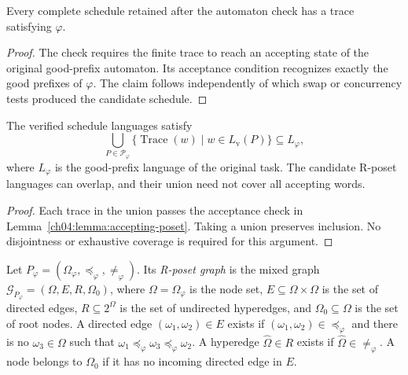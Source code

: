 \begin{revision}
\begin{lemma}
\label{ch04:lemma:accepting-poset}
Every complete schedule retained after the automaton check has a trace
satisfying $\varphi$.
\end{lemma}
\begin{proof}
The check requires the finite trace to reach an accepting state of the
original good-prefix automaton. Its acceptance condition recognizes exactly
the good prefixes of $\varphi$. The claim follows independently of which
swap or concurrency tests produced the candidate schedule.
\end{proof}

\begin{lemma}
\label{ch04:lemma:complete-poset}
The verified schedule languages satisfy
\begin{equation}
\label{ch04:eq:complete_poset_language}
\bigcup_{P\in\mathcal{P}_\varphi}
\{\operatorname{Trace}(w)\mid w\in L_{\mathrm{v}}(P)\}
\subseteq L_\varphi,
\end{equation}
where $L_\varphi$ is the good-prefix language of the original task.
The candidate R-poset languages can overlap, and their union need not cover
all accepting words.
\end{lemma}
\begin{proof}
Each trace in the union passes the acceptance check in
Lemma~\ref{ch04:lemma:accepting-poset}. Taking a union preserves inclusion.
No disjointness or exhaustive coverage is required for this argument.
\end{proof}
\end{revision}

\begin{definition}
\label{ch04:def:poset-graph}
Let
$P_{\varphi}=
(\Omega_{\varphi},\preceq_{\varphi},\neq_{\varphi})$.
Its \emph{R-poset graph} is the mixed graph
$\mathcal{G}_{P_{\varphi}}=(\Omega,E,R,\Omega_{0})$,
where $\Omega=\Omega_{\varphi}$ is the node set,
$E\subseteq\Omega\times\Omega$ is the set of directed edges,
$R\subseteq 2^{\Omega}$ is the set of undirected hyperedges, and
$\Omega_{0}\subseteq\Omega$ is the set of root nodes. A directed edge
$(\omega_{1},\omega_{2})\in E$ exists if
$(\omega_{1},\omega_{2})\in\preceq_{\varphi}$ and there is no
$\omega_{3}\in\Omega$ such that
$\omega_{1}\preceq_{\varphi}\omega_{3}\preceq_{\varphi}\omega_{2}$. A
hyperedge $\widehat{\Omega}\in R$ exists if
$\widehat{\Omega}\in\neq_{\varphi}$. A node belongs to $\Omega_{0}$ if it
has no incoming directed edge in $E$.
\end{definition}

